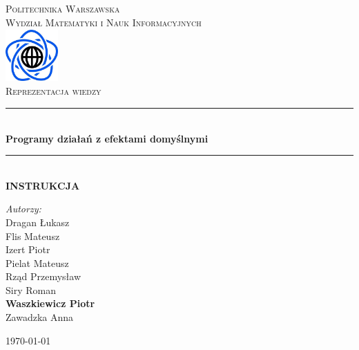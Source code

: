 \documentclass{article}
\begin{document}
	
\begin{titlepage}

\newcommand{\HRule}{\rule{\linewidth}{0.5mm}}

\begin{center}

\textsc{\LARGE Politechnika Warszawska}\\[0.5cm]
\textsc{\Large Wydział Matematyki i Nauk Informacyjnych}\\[1cm]

\includegraphics[width=2cm, height=2cm]{logo}\\[1cm]


\textsc{\Huge Reprezentacja wiedzy}\\[0.4cm]


\HRule \\[0.4cm]
{ \LARGE \bfseries Programy działań z efektami domyślnymi}\\[0.2cm]
 

\HRule \\[0.4cm]
{  \bfseries INSTRUKCJA}\\[1.5cm]

\begin{flushright}
\Large \emph{Autorzy:}\\[0.5cm]
Dragan Łukasz\\
Flis Mateusz\\
Izert Piotr\\
Pielat Mateusz\\
Rząd Przemysław\\
Siry Roman\\
\textbf{Waszkiewicz Piotr}\\
Zawadzka Anna\\[0.9cm]

\end{flushright}

\vfill
{\large \today}\\[1cm]
	
\end{center}

\end{titlepage}
\end{document}
